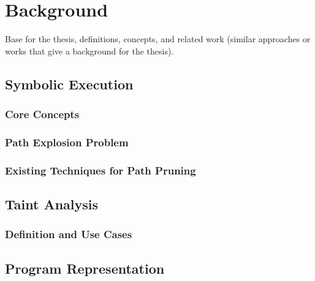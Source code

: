 \chapter{Background}

Base for the thesis, definitions, concepts, and related work (similar approaches or works that give a background for the thesis).

\section{Symbolic Execution}

\subsection{Core Concepts}

\subsection{Path Explosion Problem}

\subsection{Existing Techniques for Path Pruning}

\section{Taint Analysis}

\subsection{Definition and Use Cases}

\section{Program Representation}
